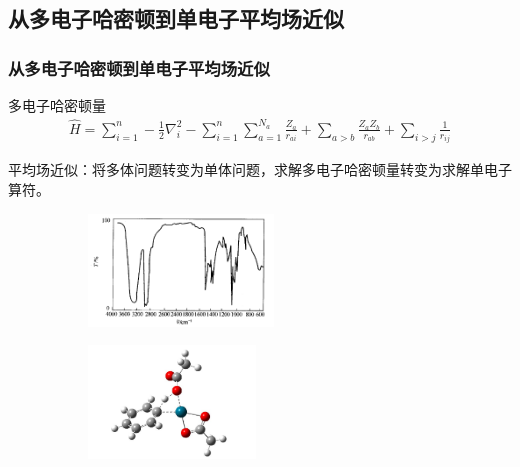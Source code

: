 \documentclass[10pt,aspectratio=43,mathserif,UTF8]{beamer}
\begin{document}
\subsection{从多电子哈密顿到单电子平均场近似}
\begin{frame}
	\frametitle{从多电子哈密顿到单电子平均场近似}
	多电子哈密顿量
	\begin{align}
		\hat{H}  = \sum_{i=1}^{n} -\frac{1}{2} \nabla_i ^ {2} - 
		\sum_{i=1}^{n}\sum_{a=1}^{N_a} \frac{Z_a}{r_{ai}} + \sum_{a>b} \frac{Z_a Z_b}{r_{ab}} + 
		\sum_{i>j} \frac{1}{r_{ij}}
	\end{align}

	平均场近似：将多体问题转变为单体问题，求解多电子哈密顿量转变为求解单电子算符。

	\begin{figure}[ht!]
		\centering
		\begin{subfigure}{0.4\linewidth}
			\centering
			\includegraphics[height=3cm]{figure/HF/ultra.png}
			\label{fig:light}
		\end{subfigure}
		\begin{subfigure}{0.4\linewidth}
			\centering
			\includegraphics[height=3cm]{figure/HF/ts.jpg}
			\label{fig:ts}
		\end{subfigure}
		\label{fig:ref}
	\end{figure}

\end{frame}

\end{document}
